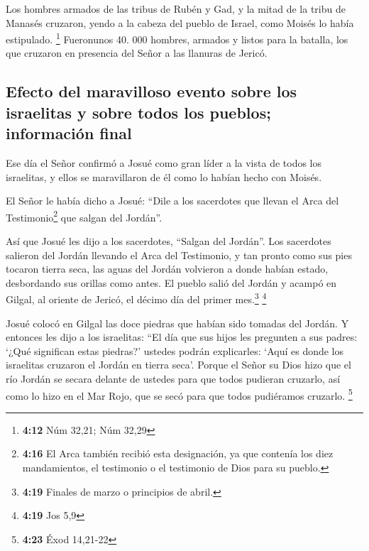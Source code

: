  Los hombres armados de las tribus de Rubén y Gad, y la
mitad de la tribu de Manasés cruzaron, yendo a la cabeza del pueblo de
Israel, como Moisés lo había estipulado. \footnote{\textbf{4:12} Núm
  32,21; Núm 32,29}  Fueronunos 40. 000 hombres, armados
y listos para la batalla, los que cruzaron en presencia del Señor a las
llanuras de Jericó.

\hypertarget{efecto-del-maravilloso-evento-sobre-los-israelitas-y-sobre-todos-los-pueblos-informaciuxf3n-final}{%
\subsection{Efecto del maravilloso evento sobre los israelitas y sobre
todos los pueblos; información
final}\label{efecto-del-maravilloso-evento-sobre-los-israelitas-y-sobre-todos-los-pueblos-informaciuxf3n-final}}

 Ese día el Señor confirmó a Josué como gran líder a la
vista de todos los israelitas, y ellos se maravillaron de él como lo
habían hecho con Moisés.

 El Señor le había dicho a Josué:  ``Dile
a los sacerdotes que llevan el Arca del Testimonio\footnote{\textbf{4:16}
  El Arca también recibió esta designación, ya que contenía los diez
  mandamientos, el testimonio o el testimonio de Dios para su pueblo.}
que salgan del Jordán''.

 Así que Josué les dijo a los sacerdotes, ``Salgan del
Jordán''.  Los sacerdotes salieron del Jordán llevando el
Arca del Testimonio, y tan pronto como sus pies tocaron tierra seca, las
aguas del Jordán volvieron a donde habían estado, desbordando sus
orillas como antes.  El pueblo salió del Jordán y acampó
en Gilgal, al oriente de Jericó, el décimo día del primer
mes.\footnote{\textbf{4:19} Finales de marzo o principios de abril.}
\footnote{\textbf{4:19} Jos 5,9}

 Josué colocó en Gilgal las doce piedras que habían sido
tomadas del Jordán.  Y entonces les dijo a los
israelitas: ``El día que sus hijos les pregunten a sus padres: `¿Qué
significan estas piedras?'  ustedes podrán explicarles:
`Aquí es donde los israelitas cruzaron el Jordán en tierra seca'.
 Porque el Señor su Dios hizo que el río Jordán se secara
delante de ustedes para que todos pudieran cruzarlo, así como lo hizo en
el Mar Rojo, que se secó para que todos pudiéramos cruzarlo. \footnote{\textbf{4:23}
  Éxod 14,21-22}

